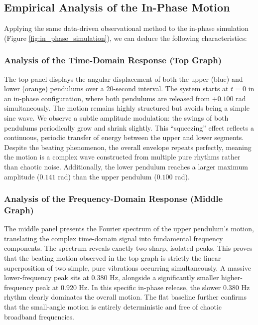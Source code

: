 \documentclass[12pt, a4paper, twoside]{article}
\begin{document}
\subsection{Empirical Analysis of the In-Phase Motion}
Applying the same data-driven observational method to the in-phase simulation (Figure \ref{fig:in_phase_simulation}), we can deduce the following characteristics:

\subsubsection{Analysis of the Time-Domain Response (Top Graph)}
The top panel displays the angular displacement of both the upper (blue) and lower (orange) pendulums over a 20-second interval. The system starts at $t=0$ in an in-phase configuration, where both pendulums are released from $+0.100$ rad simultaneously. The motion remains highly structured but avoids being a simple sine wave. We observe a subtle amplitude modulation: the swings of both pendulums periodically grow and shrink slightly. This ``squeezing'' effect reflects a continuous, periodic transfer of energy between the upper and lower segments. Despite the beating phenomenon, the overall envelope repeats perfectly, meaning the motion is a complex wave constructed from multiple pure rhythms rather than chaotic noise. Additionally, the lower pendulum reaches a larger maximum amplitude ($0.141$ rad) than the upper pendulum ($0.100$ rad).

\subsubsection{Analysis of the Frequency-Domain Response (Middle Graph)}
The middle panel presents the Fourier spectrum of the upper pendulum's motion, translating the complex time-domain signal into fundamental frequency components. The spectrum reveals exactly two sharp, isolated peaks. This proves that the beating motion observed in the top graph is strictly the linear superposition of two simple, pure vibrations occurring simultaneously. A massive lower-frequency peak sits at $0.380 \text{ Hz}$, alongside a significantly smaller higher-frequency peak at $0.920 \text{ Hz}$. In this specific in-phase release, the slower $0.380 \text{ Hz}$ rhythm clearly dominates the overall motion. The flat baseline further confirms that the small-angle motion is entirely deterministic and free of chaotic broadband frequencies.
\end{document}

